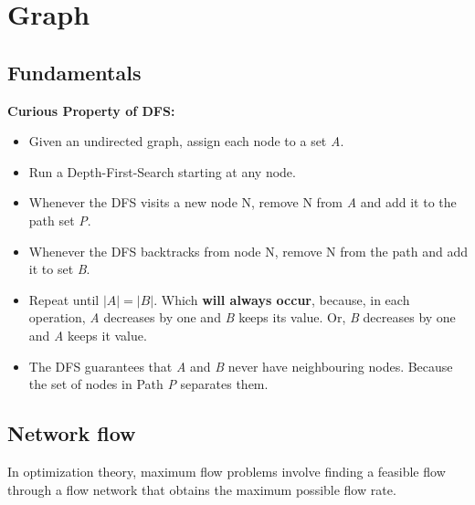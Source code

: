 \chapter{Graph}

\section{Fundamentals}

	\textbf{Curious Property of DFS:} 
	
	\begin{itemize}
	\item Given an undirected graph, assign each node to a set \textit{A}.
	
	\item Run a Depth-First-Search starting at any node.
	
	\item Whenever the DFS visits a new node N, remove N from \textit{A} and add it to the path set \textit{P}.
	
	\item Whenever the DFS backtracks from node N, remove N from the path and add it to set \textit{B}.
	
	\item Repeat until $|A| = |B|$. Which \textbf{will always occur}, because, 
	in each operation, \textit{A} decreases by one and \textit{B} keeps its value. 
	Or, \textit{B} decreases by one and \textit{A} keeps it value.
	
	\item The DFS guarantees that \textit{A} and \textit{B} never have neighbouring nodes. 
	Because the set of nodes in Path \textit{P} separates them.
	\end{itemize}
	


\section{Network flow}

	In optimization theory, maximum flow problems involve finding a 
	feasible flow through a flow network that obtains the maximum possible flow rate. 

	

    \newpage

	\vspace{1 pt}

